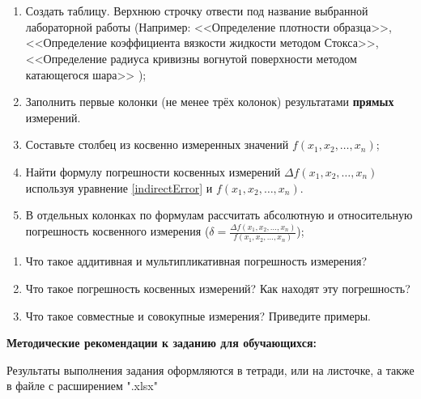 \documentclass[14pt,a4paper]{article}
\begin{document}
\section{}
\begin{enumerate}
    \item Создать таблицу. Верхнюю строчку отвести под название выбранной лабораторной работы (Например: <<Определение плотности образца>>, <<Определение  коэффициента вязкости жидкости  методом Стокса>>, <<Определение радиуса кривизны вогнутой поверхности методом катающегося шара>> );
    \item Заполнить первые колонки (не менее трёх колонок) результатами \textbf{прямых} измерений.
    \item Составьте столбец из косвенно измеренных значений $f(x_1, x_2, \ldots, x_n)$;
    \item Найти формулу погрешности косвенных измерений $\Delta f(x_1, x_2, \ldots, x_n)$ используя уравнение \ref{indirectError} и $f(x_1, x_2, \ldots, x_n)$. 
    \item В отдельных колонках по формулам рассчитать абсолютную и относительную погрешность косвенного измерения ($\delta  = \frac{\Delta f(x_1, x_2, \ldots, x_n)}{f(x_1, x_2, \ldots, x_n)}$);
\end{enumerate}

\questions{}
\begin{enumerate}
    \item Что такое аддитивная и мультипликативная погрешность измерения?
    \item Что такое погрешность косвенных измерений? Как находят эту погрешность?
    \item Что такое совместные и совокупные измерения? Приведите примеры.
\end{enumerate}

\textbf{Методические рекомендации к заданию для обучающихся:} 

Результаты выполнения задания оформляются в тетради, или на листочке, а также в файле с расширением ".xlsx"
% 
\end{document}
